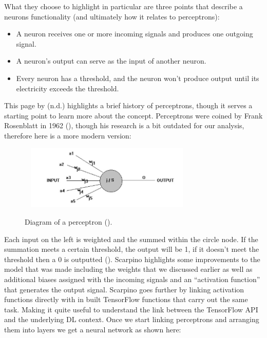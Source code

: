 \documentclass{article}
\begin{document}
What they choose to highlight in particular are three points that describe a neurons functionality (and ultimately how 
it relates to perceptrons):

\begin{itemize}
    \item A neuron receives one or more incoming signals and produces one outgoing signal.
    \item A neuron's output can serve as the input of another neuron.
    \item Every neuron has a threshold, and the neuron won't produce output until its electricity exceeds the threshold.
\end{itemize}

This page by \citeauthor{anonpercep} (n.d.) highlights a brief history of perceptrons, though 
it serves a starting point to learn more about the concept. Perceptrons were coined by Frank Rosenblatt in 1962  
(\cite{rosenblatt1961principles}), though his research is a bit outdated for our analysis, therefore here is a 
more modern version:

\begin{figure}[h]\
    \centering
    \includegraphics[width=0.7\textwidth]{perceptron.jpg}
    \caption{Diagram of a perceptron (\cite{anonpercep}).}
\end{figure}

Each input on the left is weighted and the summed within the circle node. If the summation meets a certain threshold, 
the output will be 1, if it doesn't meet the threshold then a 0 is outputted (\cite{ScarpinoMatthew2018Tfd}). 
Scarpino highlights some 
improvements to the model that was made including the weights that we discussed earlier as well as additional biases 
assigned with the incoming signals and an “activation function” that generates the output signal. Scarpino goes further 
by linking activation functions directly with in built TensorFlow functions that carry out the same task. Making it 
quite useful to understand the link between the TensorFlow API and the underlying DL context. Once we start linking 
perceptrons and arranging them into layers we get a neural network as shown here:
\end{document}
